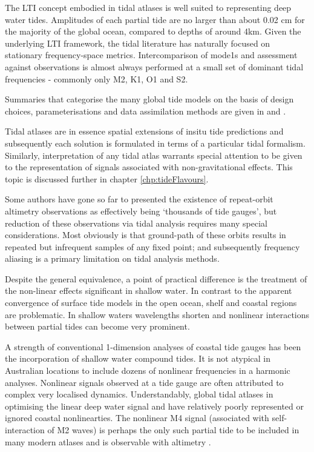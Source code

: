 The LTI concept embodied in tidal atlases is well suited to representing deep water tides.   Amplitudes of each partial tide are no larger than about 0.02 cm for the majority of the global ocean, compared to depths of around 4km.
Given the underlying LTI framework, the tidal literature has naturally focused on stationary frequency-space metrics.  Intercomparison of mode1s and assessment against observations is almost always performed at a small set of dominant tidal frequencies - commonly only M2, K1, O1 and S2.

Summaries that categorise the many global tide models on the basis of design choices, parameterisations and data assimilation methods are given in \citet{Ardalan:2008gs} and \citet{Matsumoto:2000tg}. 

Tidal atlases are in essence spatial extensions of insitu tide predictions and subsequently each solution is formulated in terms of a particular tidal formalism.  
Similarly, interpretation of any tidal atlas warrants special attention to be given to the representation of signals associated with non-gravitational effects.   This topic is discussed further in chapter \ref{chp:tideFlavours}.


Some authors have gone so far to presented the existence of repeat-orbit altimetry observations as effectively being `thousands of tide gauges', but reduction of these observations via tidal analysis requires many special considerations. Most obviously is that ground-path of these orbits results in repeated but infrequent samples of any fixed point; and subsequently frequency aliasing is a primary limitation on tidal analysis methods.



Despite the general equivalence, a point of practical difference is the treatment of the non-linear effects significant in shallow water.
In contrast to the apparent convergence of surface tide models in the open ocean, shelf and coastal regions are problematic.   In shallow waters wavelengths shorten and nonlinear interactions between partial tides can become very prominent. 


A strength of conventional 1-dimension analyses of coastal tide gauges has been the incorporation of shallow water compound tides.  It is not atypical in Australian locations to include dozens of nonlinear frequencies in a harmonic analyses.   Nonlinear signals observed at a tide gauge are often attributed to complex very localised dynamics.  
Understandably, global tidal atlases in optimising the linear deep water signal and have relatively poorly represented or ignored coastal nonlinearties.  The nonlinear M4 signal (associated with self-interaction of M2 waves) is perhaps the only such partial tide to be included in many modern atlases and is observable with altimetry \citep{Ray:2010jm}.


